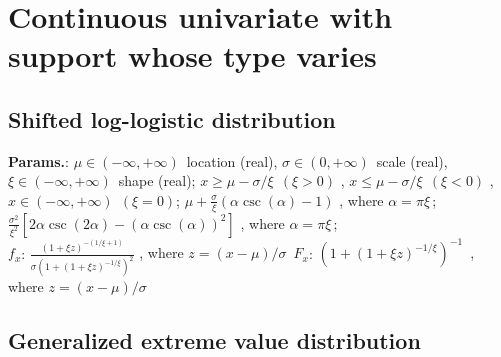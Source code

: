     


    \section{Continuous univariate with support whose type varies}
        

        
    
        
\subsection{Shifted log-logistic distribution}





    {\color{darkblue} \textbf{Params.}:} {$\mu \in (-\infty,+\infty) \,$ location (real),  $\sigma \in (0,+\infty)    \,$ scale (real),  $\xi\in (-\infty,+\infty)  \,$ shape (real)}; {$x \geqslant \mu -\sigma/\xi\,\;(\xi > 0)$ ,  $x \leqslant \mu -\sigma/\xi\,\;(\xi < 0)$ ,  $x \in (-\infty, +\infty)   \,\;(\xi = 0)$}; {$\mu + \frac{\sigma}{\xi}(\alpha \csc(\alpha)-1)$ , 
where $\alpha= \pi \xi\, $}; {$ \frac{\sigma^2}{\xi^2}[2\alpha \csc(2 \alpha) - (\alpha \csc(\alpha))^2]  $ , 
where $\alpha= \pi \xi\, $};\hspace{0.5cm}\\{\color{darkblue} \textbf{$f_x$}:} {$\frac{(1+\xi z)^{-(1/\xi +1)}}{\sigma\left(1 + (1+\xi z)^{-1/\xi}\right)^2} $ , 
where $z=(x-\mu)/\sigma\,$}{\color{darkblue} \textbf{$F_x$}:} {$\left(1+(1 + \xi z)^{-1/\xi}\right)^{-1} \,$ , 
where $z=(x-\mu)/\sigma\,$}



    
        
\subsection{Generalized extreme value distribution}





